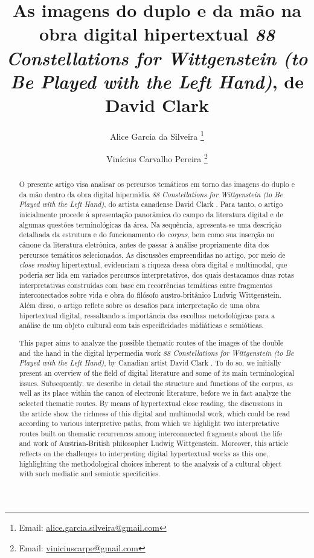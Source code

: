 \documentclass[portuguese]{textolivre}
\title{As imagens do duplo e da mão na obra digital hipertextual \emph{88 Constellations for Wittgenstein (to Be Played with the Left Hand)}, de David Clark}
\author[1]{Alice Garcia da Silveira \orcid{0000-0002-5938-0963} \thanks{Email: \url{alice.garcia.silveira@gmail.com}}}
\author[2]{Vinícius Carvalho Pereira \orcid{0000-0003-1844-8084} \thanks{Email: \url{viniciuscarpe@gmail.com}}}
\affil[1]{Secretaria de Estado de Educação de Mato Grosso, Cuiabá, MT, Brasil.}
\affil[2]{Universidade Federal de Mato Grosso, Departamento de Letras, Cuiabá, MT, Brasil.}
\begin{document}
\maketitle

\begin{polyabstract}
\begin{abstract}
O presente artigo visa analisar os percursos temáticos em torno das imagens do duplo e da mão dentro da obra digital hipermídia \emph{88 Constellations for Wittgenstein (to Be Played with the Left Hand)}, do artista canadense David Clark \cite*{clark2010}. Para tanto, o artigo inicialmente procede à apresentação panorâmica do campo da literatura digital e de algumas questões terminológicas da área. Na sequência, apresenta-se uma descrição detalhada da estrutura e do funcionamento do \textit{corpus}, bem como sua inserção no cânone da literatura eletrônica, antes de passar à análise propriamente dita dos percursos temáticos selecionados. As discussões empreendidas no artigo, por meio de \textit{close reading} hipertextual, evidenciam a riqueza dessa obra digital e multimodal, que poderia ser lida em variados percursos interpretativos, dos quais destacamos duas rotas interpretativas construídas com base em recorrências temáticas entre fragmentos interconectados sobre vida e obra do filósofo austro-britânico Ludwig Wittgenstein. Além disso, o artigo reflete sobre os desafios para interpretação de uma obra hipertextual digital, ressaltando a importância das escolhas metodológicas para a análise de um objeto cultural com tais especificidades midiáticas e semióticas.

\end{abstract}

\begin{english}
\begin{abstract}
This paper aims to analyze the possible thematic routes of the images of the double and the hand in the digital hypermedia work \emph{88 Constellations for Wittgenstein (to Be Played with the Left Hand)}, by Canadian artist David Clark \cite*{clark2010}. To do so, we initially present an overview of the field of digital literature and some of its main terminological issues. Subsequently, we describe in detail the structure and functions of the corpus, as well as its place within the canon of electronic literature, before we in fact analyze the selected thematic routes. By means of hypertextual close reading, the discussions in the article show the richness of this digital and multimodal work, which could be read according to various interpretive paths, from which we highlight two interpretative routes built on thematic recurrences among interconnected fragments about the life and work of Austrian-British philosopher Ludwig Wittgenstein. Moreover, this article reflects on the challenges to interpreting digital hypertextual works as this one, highlighting the methodological choices inherent to the analysis of a cultural object with such mediatic and semiotic specificities.


\end{abstract}
\end{english}
\end{polyabstract}
\end{document}
